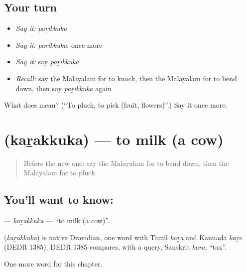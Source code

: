 \subsection*{Your turn}
\begin{itemize}
\raggedright
  \item \emph{Say it:} \emph{paṟikkuka}
  \item \emph{Say it:} \emph{paṟikkuka}, once more
  \item \emph{Say it:} say \emph{paṟikkuka}
  \item \emph{Recall:} say the Malayalam for to knock, then the Malayalam for to bend down, then say \emph{paṟikkuka} again
\end{itemize}

\begin{tcolorbox}[breakable,colback=teal!4,colframe=teal!35!black,title={Before you move on}]
What does  mean? (\textquotedblleft{}To pluck, to pick (fruit, flowers)\textquotedblright{}.) Say it once more.
\end{tcolorbox}
\section[\texorpdfstring{\ml{കറക്കുക} (kaṟakkuka)}{കറക്കുക (kaṟakkuka)}]{ (kaṟakkuka) — to milk (a cow)}

\label{lesson:ML-C231-karakkuka}



\begin{quote}
Before the new one: say the Malayalam for to bend down, then the Malayalam for to pluck.
\end{quote}

\subsection*{You'll want to know: }
\textbf{} — \emph{kaṟakkuka} — \textquotedblleft{}to milk (a cow)\textquotedblright{}.

\begin{cousinweb}
\textbf{} (\emph{kaṟakkuka}) is native Dravidian, one word with Tamil \emph{kaṟa} and Kannada \emph{kaṟe} (DEDR 1385). DEDR 1385 compares, with a query, Sanskrit \emph{kara}, \textquotedblleft{}tax\textquotedblright{}.
\end{cousinweb}

\begin{grammarlens}[title={What you've built}]
One more word for this chapter.
\end{grammarlens}

